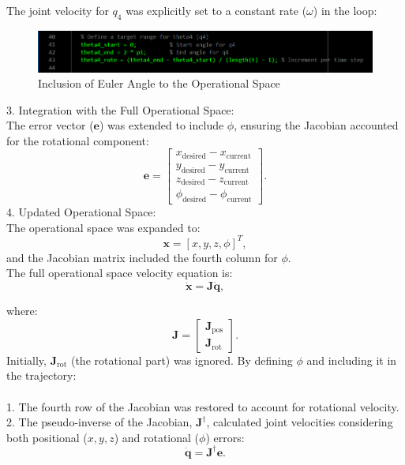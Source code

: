\documentclass[12pt]{report}
\begin{document}
		The joint velocity for \(q_4\) was explicitly set to a constant rate (\(\omega\)) in the loop:
	\begin{figure}[H]
		\centering
		\includegraphics[scale=0.8]{Q1} %
		\caption{Inclusion of Euler Angle to the Operational Space}
		\label{run10} %
	\end{figure}
	3. Integration with the Full Operational Space:\\The error vector (\(\mathbf{e}\)) was extended to include \(\phi\), ensuring the Jacobian accounted for the rotational component:
	\begin{equation}
		\mathbf{e} = \begin{bmatrix}
			x_{\text{desired}} - x_{\text{current}} \\
			y_{\text{desired}} - y_{\text{current}} \\
			z_{\text{desired}} - z_{\text{current}} \\
			\phi_{\text{desired}} - \phi_{\text{current}}
		\end{bmatrix}.
	\end{equation}
	4. Updated Operational Space:\\The operational space was expanded to:
		\[
		\mathbf{x} = [x, y, z, \phi]^T,
		\]
		and the Jacobian matrix included the fourth column for \(\phi\).\\The full operational space velocity equation is:
	\[
	\dot{\mathbf{x}} = \mathbf{J} \dot{\mathbf{q}},
	\]
	
		where:
		\[
		\mathbf{J} =
		\begin{bmatrix}
			\mathbf{J}_{\text{pos}} \\
			\mathbf{J}_{\text{rot}}
		\end{bmatrix}.
		\]Initially, \(\mathbf{J}_{\text{rot}}\) (the rotational part) was ignored. By defining \(\phi\) and including it in the trajectory:\\\\
		1. The fourth row of the Jacobian was restored to account for rotational velocity.\\
		2. The pseudo-inverse of the Jacobian, \(\mathbf{J}^\dagger\), calculated joint velocities considering both positional (\(x, y, z\)) and rotational (\(\phi\)) errors:
		\[
		\dot{\mathbf{q}} = \mathbf{J}^\dagger \mathbf{e}.
		\]
		
\end{document}
